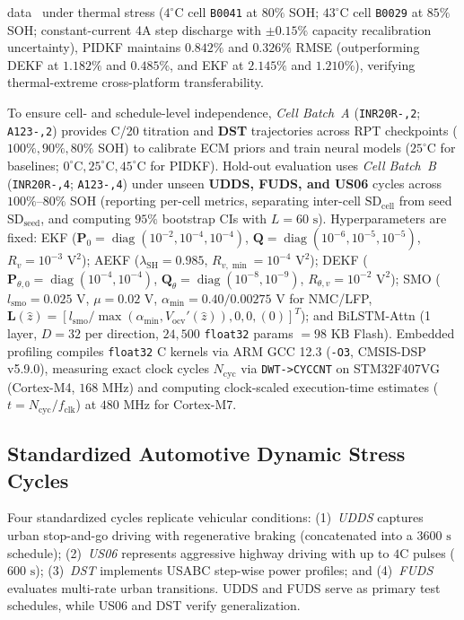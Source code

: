 \documentclass[preprint,12pt]{elsarticle}
\begin{document}
data~\cite{Saha2007nasa} under thermal stress ($4^\circ\text{C}$ cell \texttt{B0041} at $80\%$ SOH; $43^\circ\text{C}$ cell \texttt{B0029} at $85\%$ SOH; constant-current 4A step discharge with $\pm 0.15\%$ capacity recalibration uncertainty), PIDKF maintains $0.842\%$ and $0.326\%$ RMSE (outperforming DEKF at $1.182\%$ and $0.485\%$, and EKF at $2.145\%$ and $1.210\%$), verifying thermal-extreme cross-platform transferability.

To ensure cell- and schedule-level independence, \emph{Cell Batch~A} (\texttt{INR20R-,2}; \texttt{A123-,2}) provides C/20 titration and \textbf{DST} trajectories across RPT checkpoints ($100\%, \allowbreak 90\%, \allowbreak 80\%$ SOH) to calibrate ECM priors and train neural models ($25^\circ\text{C}$ for baselines; $0^\circ\text{C}, \allowbreak 25^\circ\text{C}, \allowbreak 45^\circ\text{C}$ for PIDKF). Hold-out evaluation uses \emph{Cell Batch~B} (\texttt{INR20R-,4}; \texttt{A123-,4}) under unseen \textbf{UDDS, FUDS, and US06} cycles across $100\%\text{--}80\%$ SOH (reporting per-cell metrics, separating inter-cell $\text{SD}_{\text{cell}}$ from seed $\text{SD}_{\text{seed}}$, and computing $95\%$ bootstrap CIs with $L=60\text{ s}$). Hyperparameters are fixed: EKF ($\mathbf{P}_0 = \allowbreak\operatorname{diag}(10^{-2}, \allowbreak 10^{-4}, \allowbreak 10^{-4})$, $\mathbf{Q} = \allowbreak\operatorname{diag}(10^{-6}, \allowbreak 10^{-5}, \allowbreak 10^{-5})$, $R_v = \allowbreak 10^{-3}\text{ V}^2$); AEKF ($\lambda_{\text{SH}} = 0.985$, $R_{v,\min} = \allowbreak 10^{-4}\text{ V}^2$); DEKF ($\mathbf{P}_{\theta,0} = \allowbreak\operatorname{diag}(10^{-4}, \allowbreak 10^{-4})$, $\mathbf{Q}_\theta = \allowbreak\operatorname{diag}(10^{-8}, \allowbreak 10^{-9})$, $R_{\theta,v} = \allowbreak 10^{-2}\text{ V}^2$); SMO ($l_{\text{smo}} = 0.025\text{ V}$, $\mu = 0.02\text{ V}$, $\alpha_{\min} = 0.40/0.00275\text{ V}$ for NMC/LFP, $\mathbf{L}(\hat{z}) = [l_{\text{smo}}/\max(\alpha_{\min}, V_{\text{ocv}}'(\hat{z})), 0, 0, (0)]^T$); and BiLSTM-Attn (1 layer, $D=32$ per direction, $24,500$ \texttt{float32} params $= 98\text{ KB}$ Flash). Embedded profiling compiles \texttt{float32} C kernels via ARM GCC 12.3 (\texttt{-O3}, CMSIS-DSP v5.9.0), measuring exact clock cycles $N_{\text{cyc}}$ via \texttt{DWT-}\allowbreak\texttt{>CYCCNT} on STM32F407VG (Cortex-M4, $168\text{ MHz}$) and computing clock-scaled execution-time estimates ($t = \allowbreak N_{\text{cyc}}/f_{\text{clk}}$) at $480\text{ MHz}$ for Cortex-M7.

\subsection{Standardized Automotive Dynamic Stress Cycles}
Four standardized cycles replicate vehicular conditions: (1)~\emph{UDDS} captures urban stop-and-go driving with regenerative braking (concatenated into a $3600\text{ s}$ schedule); (2)~\emph{US06} represents aggressive highway driving with up to $4\text{C}$ pulses ($600\text{ s}$); (3)~\emph{DST} implements USABC step-wise power profiles; and (4)~\emph{FUDS} evaluates multi-rate urban transitions. UDDS and FUDS serve as primary test schedules, while US06 and DST verify generalization.
\end{document}
